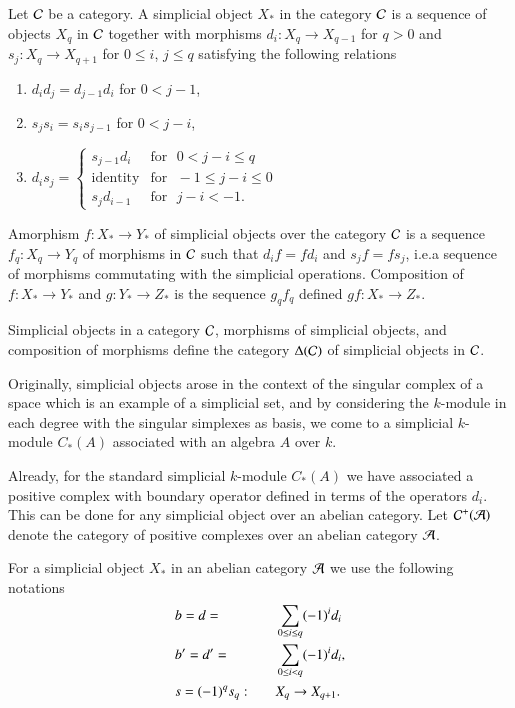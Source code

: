 \begin{definition}\label{chap3-defi2.2}
Let $\mathcal{C}$ be a category. A simplicial object $X_{\ast}$ in the category
$\mathcal{C}$ is a sequence of objects $X_{q}$ in $\mathcal{C}$ together with morphisms
$d_{i}:X_{q}\to X_{q-1}$ for $q>0$ and $s_{j}:X_{q}\to X_{q+1}$ for
$0\leq i$, $j\leq q$ satisfying the following relations
\begin{enumerate}
\renewcommand{\labelenumi}{(\theenumi)}
\item $d_{i}d_{j}=d_{j-1}d_{i}$ for $0<j-1$,

\item $s_{j}s_{i}=s_{i}s_{j-1}$ for $0<j-i$,

\item $d_{i}s_{j}=
\begin{cases}
s_{j-1}d_{i} & \text{for~ } 0<j-i\leq q\\
\text{identity} & \text{for~ } -1\leq j-i\leq 0\\
s_{j}d_{i-1} & \text{for~ } j-i<-1.
\end{cases}
$
\end{enumerate}

A\pageoriginale morphism $f:X_{\ast}\to Y_{\ast}$ of simplicial
objects over the category $\mathcal{C}$ is a sequence $f_{q}:X_{q}\to Y_{q}$ of
morphisms in $\mathcal{C}$ such that $d_{i}f=fd_{i}$ and $s_{j}f=fs_{j}$,
i.e.\@ a sequence of morphisms commutating with the simplicial
operations. Composition of $f:X_{\ast}\to Y_{\ast}$ and $g:Y_{\ast}\to
Z_{\ast}$ is the sequence $g_{q}f_{q}$ defined $gf:X_{\ast}\to
Z_{\ast}$. 
\end{definition}

Simplicial objects in a category $\mathcal{C}$, morphisms of simplicial
objects, and composition of morphisms define the category $\Delta(\mathcal{C})$
of simplicial objects in $\mathcal{C}$.

Originally, simplicial objects arose in the context of the singular
complex of a space which is an example of a simplicial set, and by
considering the $k$-module in each degree with the singular simplexes
as basis, we come to a simplicial $k$-module $C_{\ast}(A)$ associated
with an algebra $A$ over $k$.

Already, for the standard simplicial $k$-module $C_{\ast}(A)$ we have
associated a positive complex with boundary operator defined in terms
of the operators $d_{i}$. This can be done for any simplicial object
over an abelian category. Let $\mathcal{C}^{+}(\mathcal{A})$ denote the category of
positive complexes over an abelian category $\mathcal{A}$.

\begin{notation}\label{chap3-not2.3}
For a simplicial object $X_{\ast}$ in an abelian category $\mathcal{A}$ we use
the following notations
\begin{alignat*}{2}
 & b=d= &\quad& \sum_{0\leq i\leq q}(-1)^{i}d_{i}\\
 & b'=d'= &\quad& \sum\limits_{0\leq i<q}(-1)^{i}d_{i},\\
 & s=(-1)^{q}s_{q}: &\quad& X_{q}\to X_{q+1}.
\end{alignat*}
\end{notation}

